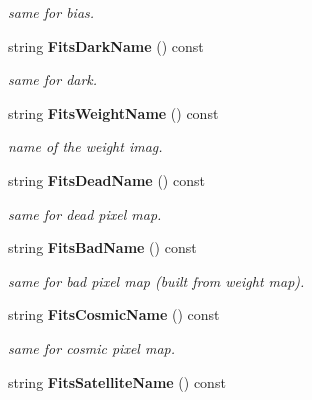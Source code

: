 \begin{CompactItemize}
\begin{CompactList}\small\item\em same for bias.\item\end{CompactList}\item 
{}
string {\bf Fits\-Dark\-Name} () const\label{class_dbimage_a13}

\begin{CompactList}\small\item\em same for dark.\item\end{CompactList}\item 
{}
string {\bf Fits\-Weight\-Name} () const\label{class_dbimage_a14}

\begin{CompactList}\small\item\em name of the weight imag.\item\end{CompactList}\item 
{}
string {\bf Fits\-Dead\-Name} () const\label{class_dbimage_a15}

\begin{CompactList}\small\item\em same for dead pixel map.\item\end{CompactList}\item 
{}
string {\bf Fits\-Bad\-Name} () const\label{class_dbimage_a16}

\begin{CompactList}\small\item\em same for bad pixel map (built from weight map).\item\end{CompactList}\item 
{}
string {\bf Fits\-Cosmic\-Name} () const\label{class_dbimage_a17}

\begin{CompactList}\small\item\em same for cosmic pixel map.\item\end{CompactList}\item 
{}
string {\bf Fits\-Satellite\-Name} () const\label{class_dbimage_a18}


\end{CompactItemize}
